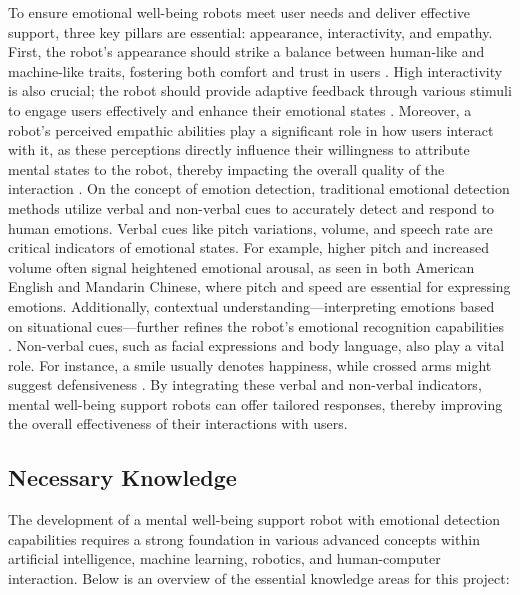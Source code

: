 To ensure emotional well-being robots meet user needs and deliver effective support, three key pillars are essential: appearance, interactivity, and empathy. First, the robot’s appearance should strike a balance between human-like and machine-like traits, fostering both comfort and trust in users \cite{10.1145/3640794.3665551}. High interactivity is also crucial; the robot should provide adaptive feedback through various stimuli to engage users effectively and enhance their emotional states \cite{Wang_2024}. Moreover, a robot’s perceived empathic abilities play a significant role in how users interact with it, as these perceptions directly influence their willingness to attribute mental states to the robot, thereby impacting the overall quality of the interaction \cite{lillo2024investigatingrelationshipempathyattribution}. On the concept of emotion detection, traditional emotional detection methods utilize verbal and non-verbal cues to accurately detect and respond to human emotions. Verbal cues like pitch variations, volume, and speech rate \cite{HAKANPAA2021570} are critical indicators of emotional states. For example, higher pitch and increased volume often signal heightened emotional arousal, as seen in both American English and Mandarin Chinese, where pitch and speed are essential for expressing emotions. Additionally, contextual understanding—interpreting emotions based on situational cues—further refines the robot’s emotional recognition capabilities \cite{abbas2024context}. Non-verbal cues, such as facial expressions and body language, also play a vital role. For instance, a smile usually denotes happiness, while crossed arms might suggest defensiveness \cite{liu2024emotiondetectionbodygesture}. By integrating these verbal and non-verbal indicators, mental well-being support robots can offer tailored responses, thereby improving the overall effectiveness of their interactions with users.

\subsection{Necessary Knowledge}

The development of a mental well-being support robot with emotional detection capabilities requires a strong foundation in various advanced concepts within artificial intelligence, machine learning, robotics, and human-computer interaction. Below is an overview of the essential knowledge areas for this project:

